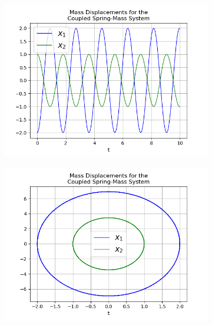 \documentclass{article}
\begin{document}
\begin{figure}[h!]
  \centering
  \begin{subfigure}[b]{0.32\linewidth}
    \includegraphics[width=\linewidth]{two_springs221.png}
     \caption{}
  \end{subfigure}
  \begin{subfigure}[b]{0.32\linewidth}
    \includegraphics[width=\linewidth]{two_springs222.png}
    \caption{}
  \end{subfigure}
  \begin{subfigure}[b]{0.32\linewidth}

\end{subfigure}
\end{figure}
\end{document}
